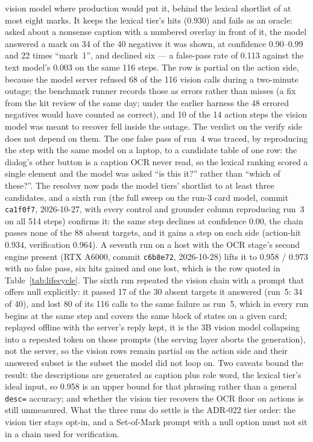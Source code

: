 \documentclass[11pt,a4paper]{article}
\newcommand{\code}[1]{\texttt{#1}}
\begin{document}
vision model where production would put it, behind the lexical shortlist of at most
eight marks. It keeps the lexical tier's hits (0.930) and fails as an oracle: asked
about a nonsense caption with a numbered overlay in front of it, the model answered a
mark on 34 of the 40 negatives it was shown, at confidence 0.90--0.99 and 22 times
``mark~1'', and declined six --- a false-pass rate of 0.113 against the text model's
0.003 on the same 116 steps. The row is partial on the action side, because the model
server refused 68 of the 116 vision calls during a two-minute outage; the benchmark
runner records those as errors rather than misses (a fix from the kit review of the
same day; under the earlier harness the 48 errored negatives would have counted as
correct), and 10 of the 14 action steps the vision model was meant to recover fell
inside the outage. The verdict on the verify side does not depend on them. The one
false pass of run~4 was traced, by reproducing the step with the same model on a
laptop, to a candidate table of one row: the dialog's other button is a caption OCR
never read, so the lexical ranking scored a single element and the model was asked
``is this it?'' rather than ``which of these?''. The resolver now pads the model
tiers' shortlist to at least three candidates, and a sixth run (the full sweep on the
run-3 card model, commit \code{ca1f0f7}, 2026-10-27, with every control and grounder
column reproducing run~3 on all 514 steps) confirms it: the same step declines at
confidence 0.00, the chain passes none of the 88 absent targets, and it gains a step
on each side (action-hit 0.934, verification 0.964). A seventh run on a host with the
OCR stage's second engine present (RTX A6000, commit \code{c6b8e72}, 2026-10-28)
lifts it to 0.958 / 0.973 with no false pass, six hits gained and one lost, which is
the row quoted in Table~\ref{tab:lifecycle}. The sixth run repeated the vision chain with a prompt that
offers null explicitly: it passed 17 of the 30 absent targets it answered (run~5: 34
of 40), and lost 80 of its 116 calls to the same failure as run~5, which in every run
begins at the same step and covers the same block of states on a given card; replayed
offline with the server's reply kept, it is the 3B vision model collapsing into a
repeated token on those prompts (the serving layer aborts the generation), not the
server, so the vision rows remain partial on the action side and their answered
subset is the subset the model did not loop on. Two caveats bound the result: the descriptions
are generated as caption plus role word, the lexical tier's ideal input, so 0.958 is
an upper bound for that phrasing rather than a general \code{desc=} accuracy; and
whether the vision tier recovers the OCR floor on actions is still unmeasured. What
the three runs do settle is the ADR-022 tier order: the vision tier stays opt-in, and
a Set-of-Mark prompt with a null option must not sit in a chain used for
verification.
\end{document}
